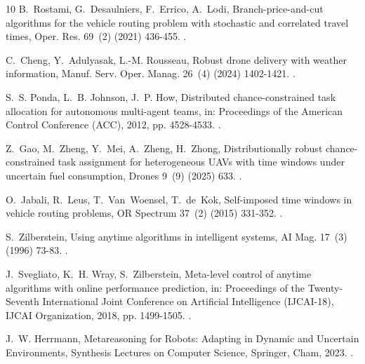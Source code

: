 \documentclass[a4paper,fleqn]{cas-dc}
\begin{document}
\begin{thebibliography}{10}
B.~Rostami, G.~Desaulniers, F.~Errico, A.~Lodi, Branch-price-and-cut algorithms
  for the vehicle routing problem with stochastic and correlated travel times,
  Oper. Res. 69~(2) (2021) 436-455.
\newblock \href {https://doi.org/10.1287/opre.2020.2037}
  {}.

C.~Cheng, Y.~Adulyasak, L.-M. Rousseau, Robust drone delivery with weather
  information, Manuf. Serv. Oper. Manag. 26~(4) (2024) 1402-1421.
\newblock \href {https://doi.org/10.1287/msom.2022.0339}
  {}.

S.~S. Ponda, L.~B. Johnson, J.~P. How, Distributed chance-constrained task
  allocation for autonomous multi-agent teams, in: Proceedings of the American
  Control Conference (ACC), 2012, pp. 4528-4533.
\newblock \href {https://doi.org/10.1109/ACC.2012.6315626}
  {}.

Z.~Gao, M.~Zheng, Y.~Mei, A.~Zheng, H.~Zhong, Distributionally robust
  chance-constrained task assignment for heterogeneous {UAVs} with time windows
  under uncertain fuel consumption, Drones 9~(9) (2025) 633.
\newblock \href {https://doi.org/10.3390/drones9090633}
  {}.

O.~Jabali, R.~Leus, T.~Van~Woensel, T.~de~Kok, Self-imposed time windows in
  vehicle routing problems, OR Spectrum 37~(2) (2015) 331-352.
\newblock \href {https://doi.org/10.1007/s00291-013-0348-1}
  {}.

S.~Zilberstein, Using anytime algorithms in intelligent systems, AI Mag. 17~(3)
  (1996) 73-83.
\newblock \href {https://doi.org/10.1609/aimag.v17i3.1232}
  {}.

J.~Svegliato, K.~H. Wray, S.~Zilberstein, Meta-level control of anytime
  algorithms with online performance prediction, in: Proceedings of the
  Twenty-Seventh International Joint Conference on Artificial Intelligence
  (IJCAI-18), IJCAI Organization, 2018, pp. 1499-1505.
\newblock \href {https://doi.org/10.24963/ijcai.2018/208}
  {}.

J.~W. Herrmann, Metareasoning for Robots: Adapting in Dynamic and Uncertain
  Environments, Synthesis Lectures on Computer Science, Springer, Cham, 2023.
\newblock \href {https://doi.org/10.1007/978-3-031-32237-2}
  {}.


\end{thebibliography}
\end{document}
